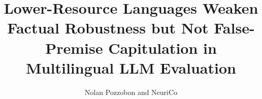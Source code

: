 \documentclass{article}
\title{Lower-Resource Languages Weaken Factual Robustness but Not False-Premise Capitulation in Multilingual LLM Evaluation}
\author{Nolan Pozzobon and NeuriCo}
\begin{document}
\maketitle

\begin{abstract}

\end{abstract}









\end{document}
